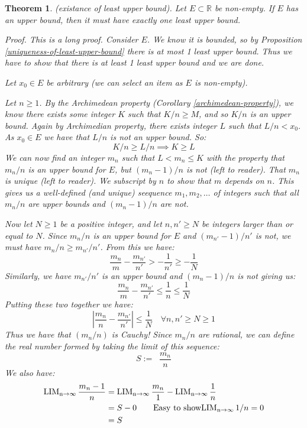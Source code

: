 \documentclass{article}
\newtheorem{theorem}{Theorem}[subsection]
\newcommand{\R}{\mathbb{R}}
\DeclareMathOperator{\infLIM}{\mathrm{LIM}_{n \to \infty}}
\let\it\textit
\begin{document}
\begin{theorem}
\label{existance-of-least-upper-bound}
	(existance of least upper bound). Let
	$E \subset \R$ be non-empty. If
	$E$ has an upper bound, then 
	it must have exactly one 
	least upper bound.

	\it{Proof}. This is a long proof. Consider 
	$E$. We know it is bounded, so 
	by Proposition \ref{uniqueness-of-least-upper-bound} 
	there is \it{at most} 1 least upper bound. 
	Thus we have to show that there is 
	\it{at least} 1 least upper bound and we are done.

	Let $x_0 \in E$  be arbitrary (we can select
	an item as $E$ is non-empty). 

	Let $n\geq 1$. By the Archimedean
	property (Corollary \ref{archimedean-property}), 
	we know there exists some integer $K$  such 
	that $K/n \geq M$, and so $K/n$ is an upper bound.
	Again by Archimedian property, there exists 
	integer $L$ such that $L/n < x_0$. As $x_0 \in E$ 
	we have that $L/n$  is not an upper bound. So:
	$$
	K/n \geq L/n \implies K \geq L
	$$
	We can now find an integer $m_n$ such 
	that $L < m_n \leq K$ with the property 
	that $m_n/n$ is an upper bound for $E$, 
	but $(m_n - 1)/n$ is not (left to reader). 
	That $m_n$ is unique (left to reader). 
	We subscript by $n$ to show that $m$ depends 
	on $n$. This gives us  a well-defined 
	(and unique) seequence $m_1, m_2, \dots$ 
	of integers such that
	all $m_n/n$ are upper bounds 
	and $(m_n -1)/n$ are not. 

	Now let $N \geq 1$ be a positive 
	integer, and let $n, n' \geq N$ be 
	integers larger than or equal to $N$. 
	Since $m_n/ n$ is an upper bound for 
	$E$ and $(m_{n'} - 1)/n'$ is not,
	we must have $m_n/n \geq m_{n'}/n'$.
	From this we have: 
	$$
	\frac{m_n}{m} - \frac{m_{n'}}{n'} > -\frac{1}{n'} \geq -
	\frac{1}{N}
	$$
	Similarly, we have $m_{n'}/n'$ is an upper 
	bound and $(m_n - 1)/n$ is not giving us:
	$$
	\frac{m_n}{m} - \frac{m_{n'}}{n'} \leq \frac{1}{n} \leq \frac{1}{N}
	$$
	Putting these two together we have:
	$$
	\left| \frac{m_n}{n} - \frac{m_{n'}}{n'} \right| \leq \frac{1}{N}\quad
	\forall n,n' \geq N \geq 1
	$$
	Thus we have that $(m_n/n)$ is Cauchy! Since $m_n/n$ are rational, 
	we can define the real number formed by taking the limit of 
	this sequence:
	$$
	S := \infLIM \frac{m_n}{n}
	$$
	We also have:
	\begin{align*}
		\infLIM \frac{m_n -1}{n} &= \infLIM \frac{m_n}{1} 
		- \infLIM \frac{1}{n} \\ 
					 &= S - 0 \tag*{Easy to show$\infLIM
					 1/n = 0$} \\
					 &= S
	\end{align*}


\end{theorem}
\end{document}
